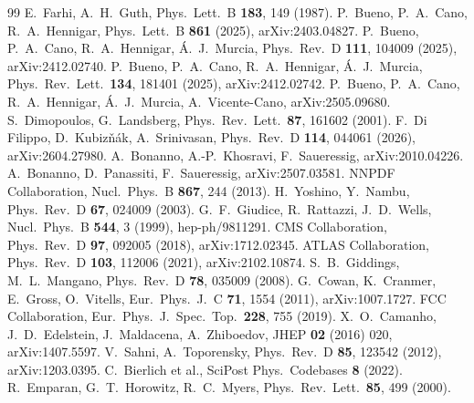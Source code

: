 \documentclass[11pt,a4paper]{article}
\theoremstyle{remark}\newtheorem{remark}[theorem]{Remark}
\begin{document}
\begin{thebibliography}{99}
 E.~Farhi, A.~H.~Guth, Phys.\ Lett.\ B \textbf{183}, 149 (1987).
 P.~Bueno, P.~A.~Cano, R.~A.~Hennigar, Phys.\ Lett.\ B \textbf{861} (2025), arXiv:2403.04827.
 P.~Bueno, P.~A.~Cano, R.~A.~Hennigar, \'A.~J.~Murcia, Phys.\ Rev.\ D \textbf{111}, 104009 (2025), arXiv:2412.02740.
 P.~Bueno, P.~A.~Cano, R.~A.~Hennigar, \'A.~J.~Murcia, Phys.\ Rev.\ Lett.\ \textbf{134}, 181401 (2025), arXiv:2412.02742.
 P.~Bueno, P.~A.~Cano, R.~A.~Hennigar, \'A.~J.~Murcia, A.~Vicente-Cano, arXiv:2505.09680.
 S.~Dimopoulos, G.~Landsberg, Phys.\ Rev.\ Lett.\ \textbf{87}, 161602 (2001).
 F.~Di Filippo, D.~Kubiz\v{n}\'ak, A.~Srinivasan, Phys.\ Rev.\ D \textbf{114}, 044061 (2026), arXiv:2604.27980.
 A.~Bonanno, A.-P.~Khosravi, F.~Saueressig, arXiv:2010.04226.
 A.~Bonanno, D.~Panassiti, F.~Saueressig, arXiv:2507.03581.
 NNPDF Collaboration, Nucl.\ Phys.\ B \textbf{867}, 244 (2013).
 H.~Yoshino, Y.~Nambu, Phys.\ Rev.\ D \textbf{67}, 024009 (2003).
 G.~F.~Giudice, R.~Rattazzi, J.~D.~Wells, Nucl.\ Phys.\ B \textbf{544}, 3 (1999), hep-ph/9811291.
 CMS Collaboration, Phys.\ Rev.\ D \textbf{97}, 092005 (2018), arXiv:1712.02345.
 ATLAS Collaboration, Phys.\ Rev.\ D \textbf{103}, 112006 (2021), arXiv:2102.10874.
 S.~B.~Giddings, M.~L.~Mangano, Phys.\ Rev.\ D \textbf{78}, 035009 (2008).
 G.~Cowan, K.~Cranmer, E.~Gross, O.~Vitells, Eur.\ Phys.\ J.\ C \textbf{71}, 1554 (2011), arXiv:1007.1727.
 FCC Collaboration, Eur.\ Phys.\ J.\ Spec.\ Top.\ \textbf{228}, 755 (2019).
 X.~O.~Camanho, J.~D.~Edelstein, J.~Maldacena, A.~Zhiboedov, JHEP \textbf{02} (2016) 020, arXiv:1407.5597.
 V.~Sahni, A.~Toporensky, Phys.\ Rev.\ D \textbf{85}, 123542 (2012), arXiv:1203.0395.
 C.~Bierlich et al., SciPost Phys.\ Codebases \textbf{8} (2022).
 R.~Emparan, G.~T.~Horowitz, R.~C.~Myers, Phys.\ Rev.\ Lett.\ \textbf{85}, 499 (2000).
\end{thebibliography}
\end{document}
